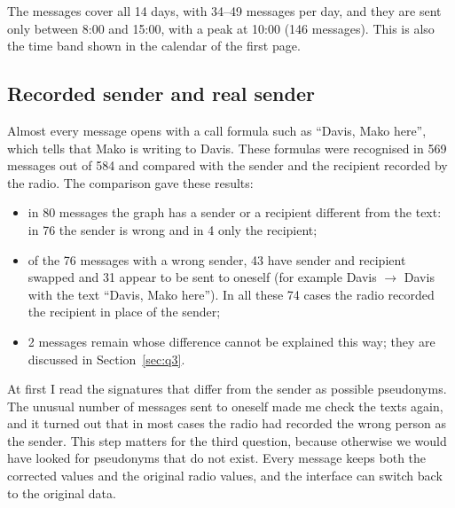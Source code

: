 \documentclass[11pt,a4paper]{article}
\begin{document}
The messages cover all 14 days, with 34--49 messages per day, and they are sent only between 8:00 and 15:00, with a
peak at 10:00 (146 messages). This is also the time band shown in the calendar of the first page.

\subsection{Recorded sender and real sender}\label{sec:senders}
Almost every message opens with a call formula such as ``Davis, Mako here'', which tells that Mako is writing to
Davis. These formulas were recognised in 569 messages out of 584 and compared with the sender and the recipient
recorded by the radio. The comparison gave these results:
\begin{itemize}
  \item in 80 messages the graph has a sender or a recipient different from the text: in 76 the sender is wrong and
        in 4 only the recipient;
  \item of the 76 messages with a wrong sender, 43 have sender and recipient swapped and 31 appear to be sent to
        oneself (for example Davis $\rightarrow$ Davis with the text ``Davis, Mako here''). In all these 74 cases the
        radio recorded the recipient in place of the sender;
  \item 2 messages remain whose difference cannot be explained this way; they are discussed in
        Section~\ref{sec:q3}.
\end{itemize}
At first I read the signatures that differ from the sender as possible pseudonyms. The unusual number of messages
sent to oneself made me check the texts again, and it turned out that in most cases the radio had recorded the wrong person as the sender. This step
matters for the third question, because otherwise we would have looked for pseudonyms that do not exist. Every
message keeps both the corrected values and the original radio values, and the interface can switch back to the
original data.
\end{document}

